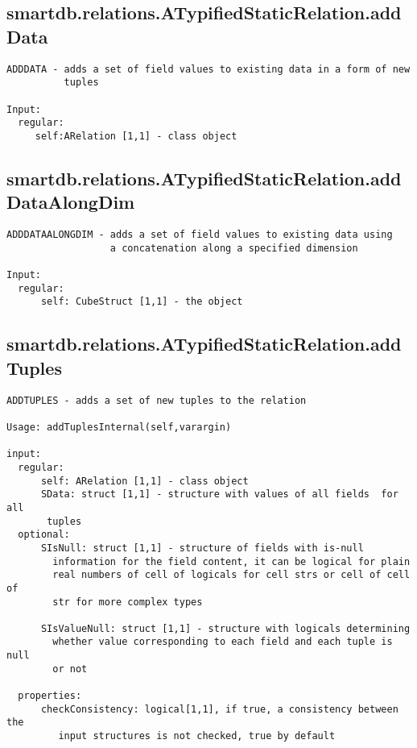 \subsection{\texorpdfstring{smartdb.relations.ATypifiedStaticRelation.addData}{addData}}\label{method:smartdb.relations.ATypifiedStaticRelation.addData}
\begin{verbatim}
ADDDATA - adds a set of field values to existing data in a form of new
          tuples

Input:
  regular:
     self:ARelation [1,1] - class object
\end{verbatim}
\subsection{\texorpdfstring{smartdb.relations.ATypifiedStaticRelation.addDataAlongDim}{addDataAlongDim}}\label{method:smartdb.relations.ATypifiedStaticRelation.addDataAlongDim}
\begin{verbatim}
ADDDATAALONGDIM - adds a set of field values to existing data using
                  a concatenation along a specified dimension

Input:
  regular:
      self: CubeStruct [1,1] - the object
\end{verbatim}
\subsection{\texorpdfstring{smartdb.relations.ATypifiedStaticRelation.addTuples}{addTuples}}\label{method:smartdb.relations.ATypifiedStaticRelation.addTuples}
\begin{verbatim}
ADDTUPLES - adds a set of new tuples to the relation

Usage: addTuplesInternal(self,varargin)

input:
  regular:
      self: ARelation [1,1] - class object
      SData: struct [1,1] - structure with values of all fields  for all
       tuples
  optional:
      SIsNull: struct [1,1] - structure of fields with is-null
        information for the field content, it can be logical for plain
        real numbers of cell of logicals for cell strs or cell of cell of
        str for more complex types

      SIsValueNull: struct [1,1] - structure with logicals determining
        whether value corresponding to each field and each tuple is null
        or not

  properties:
      checkConsistency: logical[1,1], if true, a consistency between the
         input structures is not checked, true by default
\end{verbatim}
